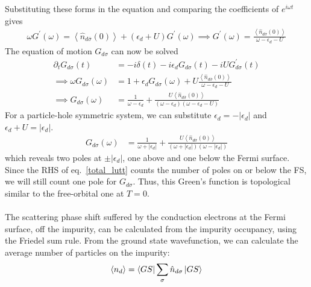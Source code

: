 \documentclass[twoside,11pt]{report}
\numberwithin{equation}{section}
\begin{document}
Substituting these forms in the equation and comparing the coefficients of \(e^{i\omega t}\) gives
\begin{equation}\begin{aligned}
	 \omega G^\prime(\omega) =  \left< \hat n_{d\overline\sigma}(0)\right> + \left( \epsilon_d + U \right) G^\prime(\omega)\implies G^\prime(\omega) = \frac{\left< \hat n_{d\overline\sigma}(0)\right>}{\omega - \epsilon_d - U}
\end{aligned}\end{equation}
The equation of motion \(G_{d\sigma}\) can now be solved
\begin{equation}\begin{aligned}
	\partial_t G_{d\sigma}(t) &= -i \delta(t) - i\epsilon_d G_{d\sigma}(t) - iU G^\prime_{d\sigma}(t)\\
	\implies \omega G_{d\sigma}(\omega) &= 1 + \epsilon_d G_{d\sigma}(\omega) + U\frac{\left< \hat n_{d\overline\sigma}(0)\right>}{\omega - \epsilon_d - U}\\
	\implies G_{d\sigma}(\omega) &= \frac{1}{\omega - \epsilon_d} + \frac{U\left< \hat n_{d\overline\sigma}(0)\right>}{\left( \omega - \epsilon_d \right) \left(\omega - \epsilon_d - U\right)}
\end{aligned}\end{equation}
For a particle-hole symmetric system, we can substitute \(\epsilon_d = -|\epsilon_d|\) and \(\epsilon_d + U = |\epsilon_d|\).
\begin{equation}\begin{aligned}
	G_{d\sigma}(\omega) &= \frac{1}{\omega + |\epsilon_d|} + \frac{U\left< \hat n_{d\overline\sigma}(0)\right>}{\left( \omega + |\epsilon_d| \right) \left(\omega - |\epsilon_d|\right)}
\end{aligned}\end{equation}
which reveals two poles at \(\pm |\epsilon_d|\), one above and one below the Fermi surface. Since the RHS of eq.~\ref{total_lutt} counts the number of poles on or below the FS, we will still count one pole for \(G_{d\sigma}\). Thus, this Green's function is topological similar to the free-orbital one at \(T=0\).
\\\\The scattering phase shift suffered by the conduction electrons at the Fermi surface, off the impurity, can be calculated from the impurity occupancy, using the Friedel sum rule. From the ground state wavefunction, we can calculate the average number of particles on the impurity:
\begin{equation}\begin{aligned}
	\left<n_d \right> = \bra{GS}\sum_\sigma \hat n_{d\sigma} \ket{GS}
\end{aligned}\end{equation}
\end{document}
